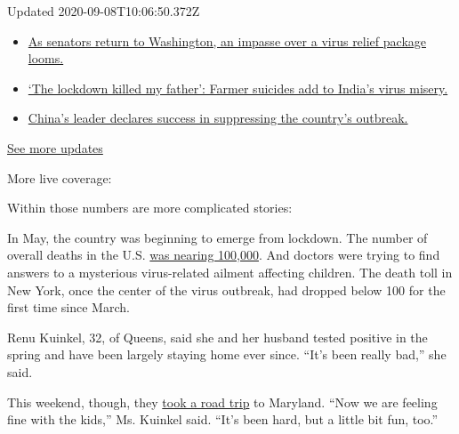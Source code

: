 Updated 2020-09-08T10:06:50.372Z

\begin{itemize}
\tightlist
\item
  \href{https://www.nytimes3xbfgragh.onion/2020/09/08/world/covid-19-coronavirus.html?action=click\&pgtype=Article\&state=default\&region=MAIN_CONTENT_1\&context=storylines_live_updates\#link-4a77847f}{As
  senators return to Washington, an impasse over a virus relief package
  looms.}
\item
  \href{https://www.nytimes3xbfgragh.onion/2020/09/08/world/covid-19-coronavirus.html?action=click\&pgtype=Article\&state=default\&region=MAIN_CONTENT_1\&context=storylines_live_updates\#link-1c973131}{`The
  lockdown killed my father': Farmer suicides add to India's virus
  misery.}
\item
  \href{https://www.nytimes3xbfgragh.onion/2020/09/08/world/covid-19-coronavirus.html?action=click\&pgtype=Article\&state=default\&region=MAIN_CONTENT_1\&context=storylines_live_updates\#link-adc17f7}{China's
  leader declares success in suppressing the country's outbreak.}
\end{itemize}

\href{https://www.nytimes3xbfgragh.onion/2020/09/08/world/covid-19-coronavirus.html?action=click\&pgtype=Article\&state=default\&region=MAIN_CONTENT_1\&context=storylines_live_updates}{See
more updates}

More live coverage:

Within those numbers are more complicated stories:

In May, the country was beginning to emerge from lockdown. The number of
overall deaths in the U.S.
\href{https://www.nytimes3xbfgragh.onion/interactive/2020/05/24/us/us-coronavirus-deaths-100000.html}{was
nearing 100,000}. And doctors were trying to find answers to a
mysterious virus-related ailment affecting children. The death toll in
New York, once the center of the virus outbreak, had dropped below 100
for the first time since March.

Renu Kuinkel, 32, of Queens, said she and her husband tested positive in
the spring and have been largely staying home ever since. ``It's been
really bad,'' she said.

This weekend, though, they
\href{https://www.nytimes3xbfgragh.onion/2020/09/07/us/virus-laborday-travel-reststop-newjersey.html}{took
a road trip} to Maryland. ``Now we are feeling fine with the kids,'' Ms.
Kuinkel said. ``It's been hard, but a little bit fun, too.''

